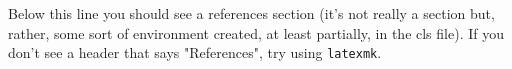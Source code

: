 \documentclass[utf8]{my_class_1_front_vanc}  %
\begin{document}
Below this line you should see a references section (it's not really a section but, rather, some
sort of environment created, at least partially, in the cls file). If you don't see a header that
says "References", try using {\tt latexmk}.


%  


 



\end{document}
